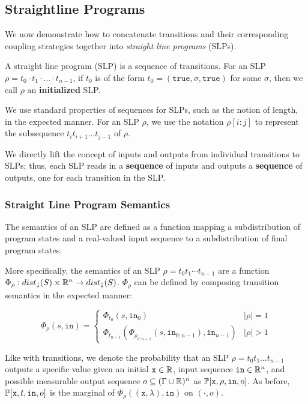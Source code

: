 
\subsection{Straightline Programs}\label{svSLPSection}

We now demonstrate how to concatenate transitions and their corresponding coupling strategies together into \textit{straight line programs} (SLPs).

\begin{defn}
    A straight line program (SLP) is a sequence of transitions. For an SLP $\rho = t_0\cdot t_1\cdot\ldots\cdot t_{n-1}$, if $t_0$ is of the form $t_0 = (\texttt{true}, \sigma, \texttt{true})$ for some $\sigma$, then we call $\rho$ an \textbf{initialized} SLP.
\end{defn}

We use standard properties of sequences for SLPs, such as the notion of length, in the expected manner. For an SLP $\rho$, we use the notation $\rho[i:j]$ to represent the subsequence  $t_i t_{i+1} \ldots t_{j-1}$ of $\rho$.

We directly lift the concept of inputs and outputs from individual transitions to SLPs; thus, each SLP reads in a \textbf{sequence} of inputs and outputs a \textbf{sequence} of outputs, one for each transition in the SLP. 

\subsubsection{Straight Line Program Semantics}

The semantics of an SLP are defined as a function mapping a subdistribution of program states and a real-valued input sequence to a subdistribution of final program states. 

More specifically, the semantics of an SLP $\rho = t_0t_1\cdots t_{n-1}$ are a function $\Phi_\rho: dist_\downarrow(S)\times \mathbb{R}^n \to dist_\downarrow(S)$. $\Phi_\rho$ can be defined by composing transition semantics in the expected manner:

\[\Phi_\rho(s, \texttt{in}) = \begin{cases}
    \Phi_{t_0}(s, \texttt{in}_0)& |\rho| = 1\\
    \Phi_{t_{n-1}}(\Phi_{\rho_{0:n-1}}(s, \texttt{in}_{0:n-1}), \texttt{in}_{n-1})& |\rho| >1
\end{cases}\]


Like with transitions, we denote the probability that an SLP $\rho = t_0 t_1\ldots t_{n-1}$ outputs a specific value given an initial $\texttt{x}\in\mathbb{R}$, input sequence $\texttt{in} \in \mathbb{R}^n$, and possible measurable output sequence $o \subseteq (\Gamma\cup\mathbb{R})^n$ as $\mathbb{P}[\texttt{x}, \rho, \texttt{in}, o]$. As before, $\mathbb{P}[\texttt{x}, t, \texttt{in}, o]$ is the marginal of $\Phi_\rho((\texttt{x}, \lambda), \texttt{in})$ on $(\cdot, o)$.

